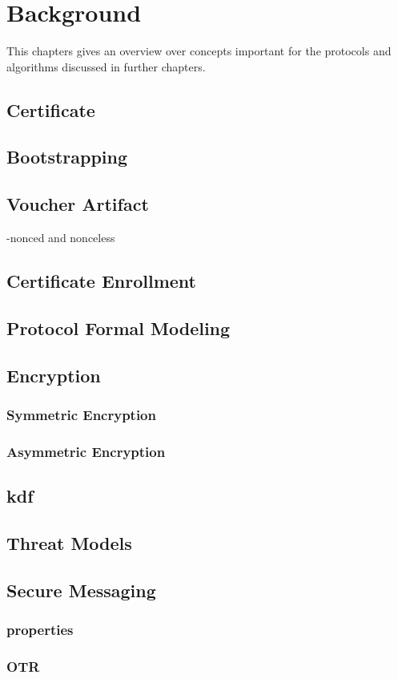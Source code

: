 \chapter{Background}
\label{ch:background}

This chapters gives an overview over concepts important for the protocols and algorithms discussed in further chapters.

\section{Certificate}

\section{Bootstrapping}

\section{Voucher Artifact}
-nonced and nonceless

\section{Certificate Enrollment}

\section{Protocol Formal Modeling}

\section{Encryption}
	\subsection{Symmetric Encryption}
	\subsection{Asymmetric Encryption}
	
\section{\acrfull*{kdf}} \label{backgroung:kdf}

\section{Threat Models}

\section{Secure Messaging}
	
	\subsection{properties}
	\subsection{OTR}